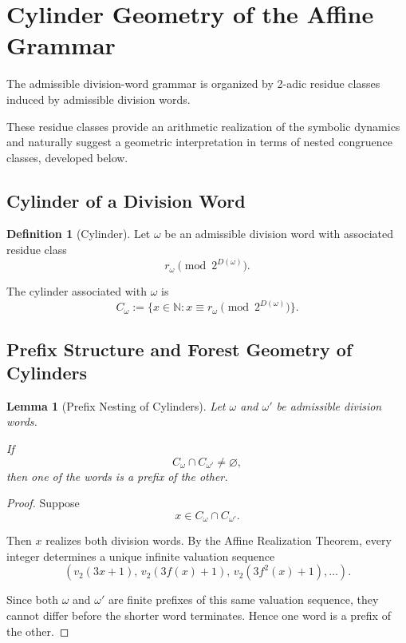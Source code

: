 \documentclass[12pt, oneside]{article}
\numberwithin{equation}{section}
\theoremstyle{definition}
\newtheorem{definition}{Definition}[section]
\theoremstyle{plain}
\newtheorem{lemma}[theorem]{Lemma}
\theoremstyle{remark}
\begin{document}

\section{Cylinder Geometry of the Affine Grammar}
\label{sec:cylinder-geometry}

The admissible division-word grammar is organized by
2-adic residue classes induced by admissible division words.

These residue classes provide an arithmetic realization of the
symbolic dynamics and naturally suggest a geometric interpretation
in terms of nested congruence classes, developed below.

\subsection{Cylinder of a Division Word}
\begin{definition}[Cylinder]
Let $\omega$ be an admissible division word with associated residue
class
\[
r_\omega \pmod{2^{D(\omega)}}.
\]

The cylinder associated with $\omega$ is
\[
C_\omega := \{x \in \mathbb N : x \equiv r_\omega \pmod{2^{D(\omega)}}\}.
\]
\end{definition}

\subsection{Prefix Structure and Forest Geometry of Cylinders}

\begin{lemma}[Prefix Nesting of Cylinders]
\label{lem:cylinder-prefix-nesting}
Let $\omega$ and $\omega'$ be admissible division words.

If
\[
C_\omega\cap C_{\omega'}\neq\varnothing,
\]
then one of the words is a prefix of the other.
\end{lemma}

\begin{proof}
Suppose
\[
x\in C_\omega\cap C_{\omega'}.
\]

Then $x$ realizes both division words. By the Affine Realization
Theorem, every integer determines a unique infinite valuation sequence
\[
(v_2(3x+1),\, v_2(3f(x)+1),\, v_2(3f^2(x)+1),\dots).
\]

Since both $\omega$ and $\omega'$ are finite prefixes of this same
valuation sequence, they cannot differ before the shorter word
terminates.  Hence one word is a prefix of the other.
\end{proof}
\end{document}
